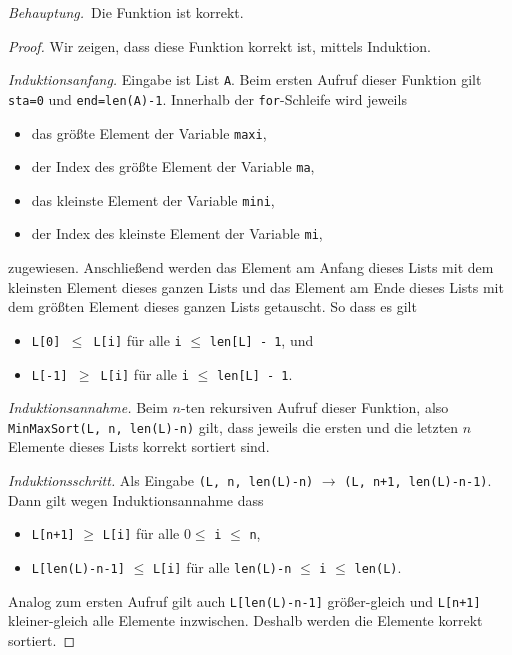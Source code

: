 \documentclass[12pt]{extarticle}
\newcommand{\beh}{\textit{Behauptung.}\ }
\begin{document}
\beh  Die Funktion ist korrekt.
\begin{proof}
  Wir zeigen, dass diese Funktion korrekt ist, mittels Induktion.

  \textit{Induktionsanfang.}  Eingabe ist List \texttt{A}.  Beim
  ersten Aufruf dieser Funktion gilt \texttt{sta=0} und
  \texttt{end=len(A)-1}.  Innerhalb der \texttt{for}-Schleife wird
  jeweils
  \begin{itemize}
  \item das größte Element der Variable \texttt{maxi},
  \item der Index des größte Element der Variable \texttt{ma},
  \item das kleinste Element der Variable \texttt{mini},
  \item der Index des kleinste Element der Variable \texttt{mi},
  \end{itemize}
  zugewiesen.  Anschließend werden das Element am Anfang dieses Lists
  mit dem kleinsten Element dieses ganzen Lists und das Element am
  Ende dieses Lists mit dem größten Element dieses ganzen Lists
  getauscht.  So dass es gilt
  \begin{itemize}
  \item \texttt{L[0] \(\leq\) L[i]} für alle \texttt{i} \(\leq\)
    \texttt{len[L] - 1}, und
  \item \texttt{L[-1] \(\geq\) L[i]} für alle \texttt{i} \(\leq\)
    \texttt{len[L] - 1}.
  \end{itemize}

  \textit{Induktionsannahme.}  Beim \(n\)-ten rekursiven Aufruf dieser
  Funktion, also \texttt{MinMaxSort(L, n, len(L)-n)} gilt, dass
  jeweils die ersten und die letzten \(n\) Elemente dieses Lists korrekt
  sortiert sind.

  \textit{Induktionsschritt.}  Als Eingabe \texttt{(L, n, len(L)-n)}
  \(\rightarrow\) \texttt{(L, n+1, len(L)-n-1)}.  Dann gilt wegen
  Induktionsannahme dass
  \begin{itemize}
  \item \texttt{L[n+1]} \(\geq\) \texttt{L[i]} für alle
  \(0\leq\) \texttt{i} \(\leq\) \texttt{n},
\item \texttt{L[len(L)-n-1]} \(\leq\) \texttt{L[i]} für alle
  \texttt{len(L)-n} \(\leq\) \texttt{i} \(\leq\) \texttt{len(L)}.
\end{itemize}

Analog zum ersten Aufruf gilt auch \texttt{L[len(L)-n-1]}
größer-gleich und \texttt{L[n+1]} kleiner-gleich alle Elemente
inzwischen.  Deshalb werden die Elemente korrekt sortiert.
\end{proof}
\end{document}
